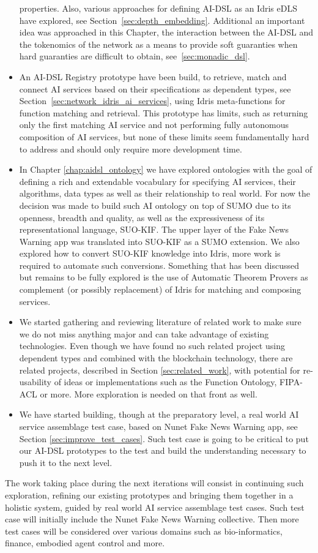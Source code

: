 \documentclass[]{report}
\begin{document}
\begin{itemize}
  properties.  Also, various approaches for defining AI-DSL as an
  Idris eDLS have explored, see Section~\ref{sec:depth_embedding}.
  Additional an important idea was approached in this Chapter, the
  interaction between the AI-DSL and the tokenomics of the network as
  a means to provide soft guaranties when hard guaranties are
  difficult to obtain, see~\ref{sec:monadic_dsl}.
\item An AI-DSL Registry prototype have been build, to retrieve, match
  and connect AI services based on their specifications as dependent
  types, see Section~\ref{sec:network_idris_ai_services}, using Idris
  meta-functions for function matching and retrieval.  This prototype
  has limits, such as returning only the first matching AI service and
  not performing fully autonomous composition of AI services, but none
  of these limits seem fundamentally hard to address and should only
  require more development time.
\item In Chapter \ref{chap:aidsl_ontology} we have explored ontologies
  with the goal of defining a rich and extendable vocabulary for
  specifying AI services, their algorithms, data types as well as
  their relationship to real world.  For now the decision was made to
  build such AI ontology on top of SUMO due to its openness, breadth
  and quality, as well as the expressiveness of its representational
  language, SUO-KIF.  The upper layer of the Fake News Warning app was
  translated into SUO-KIF as a SUMO extension.  We also explored how
  to convert SUO-KIF knowledge into Idris, more work is required to
  automate such conversions.  Something that has been discussed but
  remains to be fully explored is the use of Automatic Theorem Provers
  as complement (or possibly replacement) of Idris for matching and
  composing services.
\item We started gathering and reviewing literature of related work to
  make sure we do not miss anything major and can take advantage of
  existing technologies.  Even though we have found no such related
  project using dependent types and combined with the blockchain
  technology, there are related projects, described in Section
  \ref{sec:related_work}, with potential for re-usability of ideas or
  implementations such as the Function Ontology, FIPA-ACL or more.
  More exploration is needed on that front as well.
\item We have started building, though at the preparatory level, a
  real world AI service assemblage test case, based on Nunet Fake News
  Warning app, see Section \ref{sec:improve_test_cases}.  Such test
  case is going to be critical to put our AI-DSL prototypes to the
  test and build the understanding necessary to push it to the next
  level.
\end{itemize}
The work taking place during the next iterations will consist in
continuing such exploration, refining our existing prototypes and
bringing them together in a holistic system, guided by real world AI
service assemblage test cases.  Such test case will initially include
the Nunet Fake News Warning collective.  Then more test cases will be
considered over various domains such as bio-informatics, finance,
embodied agent control and more.
\end{document}
